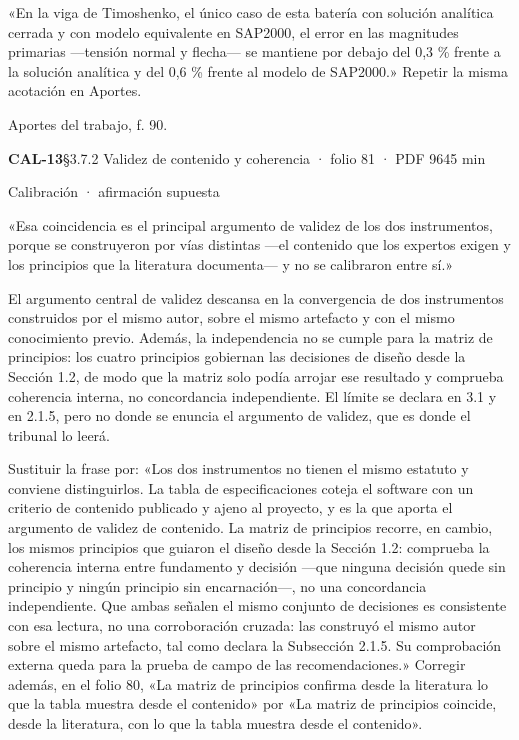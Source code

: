 \begin{debedecir}«En la viga de Timoshenko, el único caso de esta batería con solución analítica cerrada y con modelo equivalente en SAP2000, el error en las magnitudes primarias —tensión normal y flecha— se mantiene por debajo del 0,3 \% frente a la solución analítica y del 0,6 \% frente al modelo de SAP2000.» Repetir la misma acotación en Aportes.\end{debedecir}
{\small{}Aportes del trabajo, f. 90.\par}
\vspace{6pt}
\noindent\casilla\textbf{CAL-13}\quad{}\quad §3.7.2 Validez de contenido y coherencia · folio 81 · PDF 96\hfill 45 min\par\vspace{1pt}
{\small\color{gris}Calibración · afirmación supuesta}\par
\begin{dice}«Esa coincidencia es el principal argumento de validez de los dos instrumentos, porque se construyeron por vías distintas —el contenido que los expertos exigen y los principios que la literatura documenta— y no se calibraron entre sí.»\end{dice}
{\small{}El argumento central de validez descansa en la convergencia de dos instrumentos construidos por el mismo autor, sobre el mismo artefacto y con el mismo conocimiento previo. Además, la independencia no se cumple para la matriz de principios: los cuatro principios gobiernan las decisiones de diseño desde la Sección 1.2, de modo que la matriz solo podía arrojar ese resultado y comprueba coherencia interna, no concordancia independiente. El límite se declara en 3.1 y en 2.1.5, pero no donde se enuncia el argumento de validez, que es donde el tribunal lo leerá.\par}
\begin{debedecir}Sustituir la frase por: «Los dos instrumentos no tienen el mismo estatuto y conviene distinguirlos. La tabla de especificaciones coteja el software con un criterio de contenido publicado y ajeno al proyecto, y es la que aporta el argumento de validez de contenido. La matriz de principios recorre, en cambio, los mismos principios que guiaron el diseño desde la Sección 1.2: comprueba la coherencia interna entre fundamento y decisión —que ninguna decisión quede sin principio y ningún principio sin encarnación—, no una concordancia independiente. Que ambas señalen el mismo conjunto de decisiones es consistente con esa lectura, no una corroboración cruzada: las construyó el mismo autor sobre el mismo artefacto, tal como declara la Subsección 2.1.5. Su comprobación externa queda para la prueba de campo de las recomendaciones.» Corregir además, en el folio 80, «La matriz de principios confirma desde la literatura lo que la tabla muestra desde el contenido» por «La matriz de principios coincide, desde la literatura, con lo que la tabla muestra desde el contenido».\end{debedecir}
